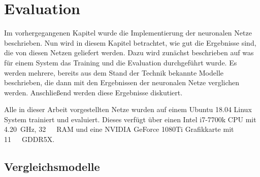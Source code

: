 \chapter{Evaluation}
\label{cap:Eval}

Im vorhergegangenen Kapitel wurde die Implementierung der neuronalen Netze beschrieben.
Nun wird in diesem Kapitel betrachtet, wie gut die Ergebnisse sind, die von diesen Netzen geliefert werden.
Dazu wird zunächst beschrieben auf was für einem System das Training und die Evaluation durchgeführt wurde.
Es werden mehrere, bereits aus dem Stand der Technik bekannte Modelle beschrieben, die dann mit den Ergebnissen der neuronalen Netze 
verglichen werden.
Anschließend werden diese Ergebnisse diskutiert.


Alle in dieser Arbeit vorgestellten Netze wurden auf einem Ubuntu 18.04 Linux System trainiert und evaluiert.
Dieses verfügt über einen Intel i7-7700k CPU mit \SI{4.20}{\giga\hertz}, \SI{32}{\giga\byte}~RAM und eine NVIDIA GeForce 1080Ti Grafikkarte mit \SI{11}{\giga\byte}~GDDR5X. 


\section{Vergleichsmodelle}



